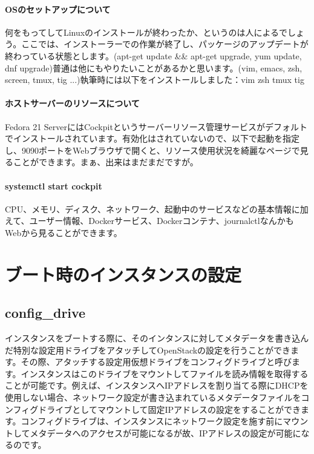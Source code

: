 \documentclass[8pt,b5paper,tombo,openany]{jsbook}
\begin{document}
\subsubsection{OSのセットアップについて}

何をもってしてLinuxのインストールが終わったか、というのは人によるでしょう。ここでは、インストーラーでの作業が終了し、パッケージのアップデートが終わっている状態とします。(apt-get update \&\& apt-get upgrade, yum update, dnf upgrade)普通は他にもやりたいことがあるかと思います。(vim, emacs, zsh, screen, tmux, tig ...)執筆時には以下をインストールしました：vim zsh tmux tig

\subsubsection{ホストサーバーのリソースについて}

Fedora 21 ServerにはCockpitというサーバーリソース管理サービスがデフォルトでインストールされています。有効化はされていないので、以下で起動を指定し、9090ポートをWebブラウザで開くと、リソース使用状況を綺麗なページで見ることができます。まぁ、出来はまだまだですが。

\subsubsection{systemctl start cockpit}

CPU、メモリ、ディスク、ネットワーク、起動中のサービスなどの基本情報に加えて、ユーザー情報、Dockerサービス、Dockerコンテナ、journalctlなんかもWebから見ることができます。

\chapter{ブート時のインスタンスの設定}

\section{config\_drive}

インスタンスをブートする際に、そのインタンスに対してメタデータを書き込んだ特別な設定用ドライブをアタッチしてOpenStackの設定を行うことができます。その際、アタッチする設定用仮想ドライブをコンフィグドライブと呼びます。インスタンスはこのドライブをマウントしてファイルを読み情報を取得することが可能です。例えば、インスタンスへIPアドレスを割り当てる際にDHCPを使用しない場合、ネットワーク設定が書き込まれているメタデータファイルをコンフィグドライブとしてマウントして固定IPアドレスの設定をすることができます。コンフィグドライブは、インスタンスにネットワーク設定を施す前にマウントしてメタデータへのアクセスが可能になるが故、IPアドレスの設定が可能になるのです。
\end{document}
